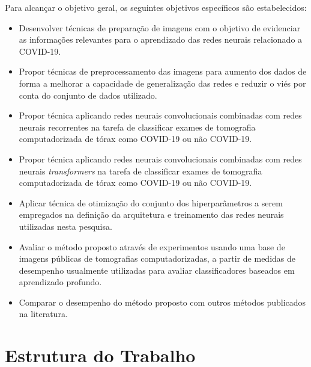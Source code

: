Para alcançar o objetivo geral, os seguintes objetivos específicos são estabelecidos: 
\begin{itemize}
  
  \item Desenvolver técnicas de preparação de imagens com o objetivo de evidenciar as informações relevantes para o aprendizado das redes neurais relacionado a COVID-19.
  
  \item Propor técnicas de preprocessamento das imagens para aumento dos dados de forma a melhorar a capacidade de generalização das redes e reduzir o viés por conta do conjunto de dados utilizado.
  
  \item Propor técnica aplicando redes neurais convolucionais combinadas com redes neurais recorrentes na tarefa de classificar exames de tomografia computadorizada de tórax como COVID-19 ou não COVID-19.
  
  \item Propor técnica aplicando redes neurais convolucionais combinadas com redes neurais \textit{transformers} na tarefa de classificar exames de tomografia computadorizada de tórax como COVID-19 ou não COVID-19.  
  
  \item Aplicar técnica de otimização do conjunto dos hiperparâmetros a serem empregados na definição da arquitetura e treinamento das redes neurais utilizadas nesta pesquisa.
  
  
  \item Avaliar o método proposto através de experimentos usando uma base de imagens públicas de tomografias computadorizadas, a partir de medidas de desempenho usualmente utilizadas para avaliar classificadores baseados em aprendizado profundo.
  
  \item Comparar o desempenho do método proposto com outros métodos publicados na literatura.
  
\end{itemize}

\section{Estrutura do Trabalho}\label{sec:cap_introducao_est_trabalho}

